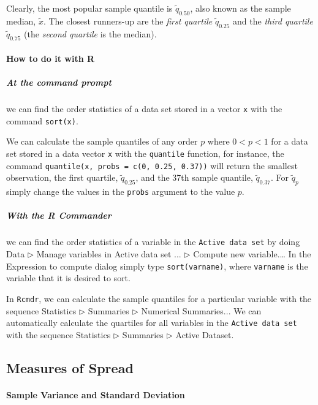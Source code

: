 \documentclass[captions=tableheading]{scrbook}
\begin{document}
Clearly, the most popular sample quantile is \(\tilde{q}_{0.50}\), also known as the sample median, \(\tilde{x}\). The closest runners-up are the \emph{first quartile} \(\tilde{q}_{0.25}\) and the \emph{third quartile} \(\tilde{q}_{0.75}\) (the \emph{second quartile} is the median). 


\paragraph*{How to do it with \textsf{R}}

\subparagraph*{At the command prompt}
we can find the order statistics of a data set stored in a vector \texttt{x} with the command \texttt{sort(x)}.

We can calculate the sample quantiles of any order \(p\) where \(0<p<1\) for a data set stored in a data vector \texttt{x} with the \texttt{quantile} function, for instance, the command \texttt{quantile(x, probs = c(0, 0.25, 0.37))} will return the smallest observation, the first quartile, \(\tilde{q}_{0.25}\), and the 37th sample quantile, \(\tilde{q}_{0.37}\). For \(\tilde{q}_{p}\) simply change the values in the \texttt{probs} argument to the value \(p\).


\subparagraph*{With the \textsf{R} Commander}
we can find the order statistics of a variable in the \texttt{Active data set} by doing \textsf{Data \(\triangleright\) Manage variables in Active data set ... \(\triangleright\) Compute new variable}.\ldots{} In the \textsf{Expression to compute} dialog simply type \texttt{sort(varname)}, where \texttt{varname} is the variable that it is desired to sort.

In \texttt{Rcmdr}, we can calculate the sample quantiles for a particular variable with the sequence \textsf{Statistics \(\triangleright\) Summaries \(\triangleright\) Numerical Summaries}... We can automatically calculate the quartiles for all variables in the \texttt{Active data set} with the sequence \textsf{Statistics \(\triangleright\) Summaries \(\triangleright\) Active Dataset}.
\subsection{Measures of Spread}
\label{sec-3-3-4}

\label{sub:Measures-of-Spread}

\paragraph*{Sample Variance and Standard Deviation}
\end{document}

